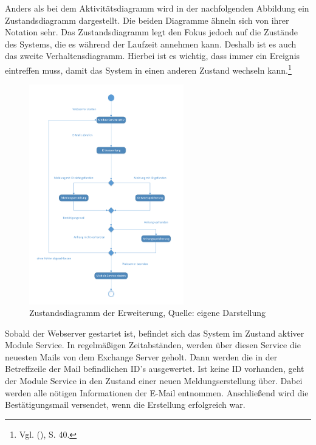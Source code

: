 \noindent
Anders als bei dem Aktivitätsdiagramm wird in der nachfolgenden Abbildung ein Zustandsdiagramm dargestellt. Die beiden Diagramme ähneln sich von ihrer Notation sehr. Das Zustandsdiagramm legt den Fokus jedoch auf die Zustände des Systems, die es während der Laufzeit annehmen kann. Deshalb ist es auch das zweite Verhaltensdiagramm. Hierbei ist es wichtig, dass immer ein Ereignis eintreffen muss, damit das System in einen anderen Zustand wechseln kann.\footnote{Vgl. \citeauthor{Balzert} (\citeyear{Balzert}), S. 40.}

\begin{figure}[h!]
\centering
\includegraphics[width=0.6\textwidth]{Abbildungen/Zustandsdiagramm.pdf}
	\caption[Zustandsdiagramm der Erweiterung]{Zustandsdiagramm der Erweiterung, Quelle: eigene Darstellung}
	\label{fig:Zustandsdiagramm}
\end{figure}

\noindent
Sobald der Webserver gestartet ist, befindet sich das System im Zustand aktiver Module Service. In regelmäßigen Zeitabständen, werden über diesen Service die neuesten Mails von dem Exchange Server geholt. Dann werden die in der Betreffzeile der Mail befindlichen ID's ausgewertet. Ist keine ID vorhanden, geht der Module Service in den Zustand einer neuen Meldungserstellung über. Dabei werden alle nötigen Informationen der E-Mail entnommen. Anschließend wird die Bestätigungsmail versendet, wenn die Erstellung erfolgreich war.\\

